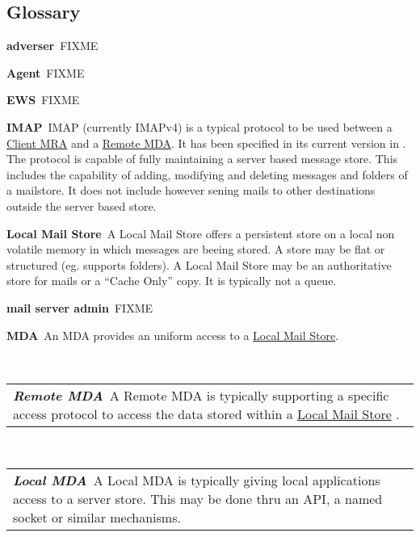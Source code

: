 \documentclass[10pt,a4paper]{scrbook}
\makeatletter
\newenvironment{entry}{\par\leavevmode\hangpara{1.5mm}{1}\ignorespaces}{\RaggedRight\par}
\newcommand*{\mainentry}[2]{{\bfseries{#1\label{def:#1}}}~#2\par}
\newcommand*{\subentry}[2]{\par~\begin{tabular}{p{\textwidth-.6cm}@{}}{\bfseries{\itshape{#1\label{def:#1}}}}~#2\end{tabular}}
\newcommand*{\defref}[1]{\hyperref[def:#1]{#1}}
\makeatother
\begin{document}
\backmatter
\begin{appendices}
\chapter{Glossary}

\begin{entry}
  \mainentry{adverser}{FIXME}
\end{entry}

\begin{entry}
  \mainentry{Agent}{FIXME}
\end{entry}

\begin{entry}
  \mainentry{EWS}{FIXME}
\end{entry}

\begin{entry}
  \mainentry{IMAP}{IMAP (currently IMAPv4) is a typical protocol to be used between a \defref{Client MRA} and a \defref{Remote MDA}. It has been specified in its current version in \cite{RFC3501}. The protocol is capable of fully maintaining a server based message store. This includes the capability of adding, modifying and deleting messages and folders of a mailstore. It does not include however sening mails to other destinations outside the server based store.}
\end{entry}

\begin{entry}
  \mainentry{Local Mail Store}{A Local Mail Store offers a persistent store on a local non volatile memory in which messages are beeing stored. A store may be flat or structured (eg. supports folders). A Local Mail Store may be an authoritative store for mails or a "`Cache Only"' copy. It is typically not a queue.}
\end{entry}

\begin{entry}
  \mainentry{mail server admin}{FIXME}
\end{entry}

\begin{entry}
  \mainentry{MDA}{An MDA provides an uniform access to a \defref{Local Mail Store}.}
  \subentry{Remote MDA}{A Remote MDA is typically supporting a specific access protocol to access the data stored within a \defref{Local Mail Store} .}
  \subentry{Local MDA}{A Local MDA is typically giving local applications access to a server store. This may be done thru an API, a named socket or similar mechanisms.}
\end{entry}


\end{appendices}
\end{document}
